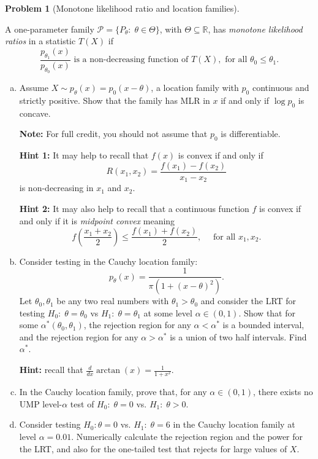 \documentclass{article}
\newcommand{\cP}{\mathcal{P}}
\newcommand{\RR}{\mathbb{R}}
\theoremstyle{definition}
\newtheorem{problem}{Problem}
\begin{document}
\begin{problem}[Monotone likelihood ratio and location families]
\label{prob:mlr-location}

A one-parameter family $\cP = \{P_\theta:\;\theta\in\Theta\}$, with $\Theta\subseteq \RR$, has {\em monotone likelihood ratios} in a statistic $T(X)$ if
\[
\frac{p_{\theta_1}(x)}{p_{\theta_0}(x)} \text{ is a non-decreasing function of } T(X), \text{ for all } \theta_0\leq \theta_1.
\]

\begin{enumerate}[(a)]
\item Assume $X\sim p_\theta(x) = p_0(x-\theta)$, a location family with $p_0$ continuous and strictly positive. Show that the family has MLR in $x$ if and only if $\log p_0$ is concave. 

{\bf Note:} For full credit, you should not assume that $p_0$ is differentiable.

{\bf Hint 1:} It may help to recall that $f(x)$ is convex if and only if
\[
R(x_1,x_2) = \frac{f(x_1) - f(x_2)}{x_1-x_2}
\]
is non-decreasing in $x_1$ and $x_2$. 

{\bf Hint 2:} It may also help to recall that a continuous function $f$ is convex if and only if it is {\em midpoint convex} meaning
\[
f\left(\frac{x_1+x_2}{2}\right) \leq \frac{f(x_1) + f(x_2)}{2}, \quad \text{ for all } x_1,x_2.
\]




\item Consider testing in the Cauchy location family:
\[
p_{\theta}(x) = \frac{1}{\pi (1+(x-\theta)^2)}.
\]
Let $\theta_0, \theta_1$ be any two real numbers with $\theta_1> \theta_0$ and consider the LRT for testing $H_0:\; \theta = \theta_0$ vs $H_1:\; \theta = \theta_1$ at some level $\alpha \in (0,1)$. Show that for some $\alpha^*(\theta_0,\theta_1)$, the rejection region for any $\alpha < \alpha^*$ is a bounded interval, and the rejection region for any $\alpha > \alpha^*$ is a union of two half intervals. Find $\alpha^*$.

{\bf Hint:} recall that $\frac{d}{dx}\arctan(x) = \frac{1}{1+x^2}$.




\item In the Cauchy location family, prove that, for any $\alpha \in (0,1)$, there exists no UMP level-$\alpha$ test of $H_0:\;\theta = 0$ vs. $H_1:\; \theta > 0$.



\item Consider testing $H_0:\theta = 0$ vs. $H_1:\; \theta = 6$ in the Cauchy location family at level $\alpha = 0.01$. Numerically calculate the rejection region and the power for the LRT, and also for the one-tailed test that rejects for large values of $X$.




\end{enumerate}
\end{problem}
\end{document}
